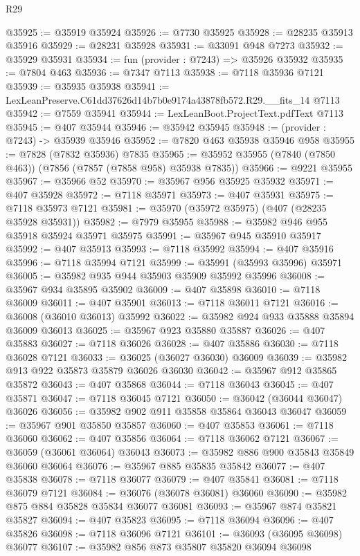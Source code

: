 \begin{lexlean}{R29}
\begin{coremodule}
@35925 := @35919 @35924
@35926 := @7730 @35925
@35928 := @28235 @35913 @35916
@35929 := @28231 @35928
@35931 := @33091 @948 @7273
@35932 := @35929 @35931
@35934 := fun (provider : @7243) => @35926 @35932
@35935 := @7804 @463
@35936 := @7347 @7113
@35938 := @7118 @35936 @7121
@35939 := @35935 @35938
@35941 := LexLeanPreserve.C61dd37626d14b7b0e9174a43878fb572.R29.__fits_14 @7113
@35942 := @7559 @35941
@35944 := LexLeanBoot.ProjectText.pdfText @7113
@35945 := @407 @35944
@35946 := @35942 @35945
@35948 := (provider : @7243) -> @35939 @35946
@35952 := @7820 @463 @35938 @35946 @958
@35955 := @7828 (@7832 @35936) @7835
@35965 := @35952 @35955 (@7840 (@7850 @463)) (@7856 (@7857 (@7858 @958) @35938 @7835))
@35966 := @9221 @35955
@35967 := @35966 @52
@35970 := @35967 @956 @35925 @35932
@35971 := @407 @35928
@35972 := @7118 @35971
@35973 := @407 @35931
@35975 := @7118 @35973 @7121
@35981 := @35970 (@35972 @35975) (@407 (@28235 @35928 @35931))
@35982 := @7979 @35955
@35988 := @35982 @946 @955 @35918 @35924 @35971 @35975
@35991 := @35967 @945 @35910 @35917
@35992 := @407 @35913
@35993 := @7118 @35992
@35994 := @407 @35916
@35996 := @7118 @35994 @7121
@35999 := @35991 (@35993 @35996) @35971
@36005 := @35982 @935 @944 @35903 @35909 @35992 @35996
@36008 := @35967 @934 @35895 @35902
@36009 := @407 @35898
@36010 := @7118 @36009
@36011 := @407 @35901
@36013 := @7118 @36011 @7121
@36016 := @36008 (@36010 @36013) @35992
@36022 := @35982 @924 @933 @35888 @35894 @36009 @36013
@36025 := @35967 @923 @35880 @35887
@36026 := @407 @35883
@36027 := @7118 @36026
@36028 := @407 @35886
@36030 := @7118 @36028 @7121
@36033 := @36025 (@36027 @36030) @36009
@36039 := @35982 @913 @922 @35873 @35879 @36026 @36030
@36042 := @35967 @912 @35865 @35872
@36043 := @407 @35868
@36044 := @7118 @36043
@36045 := @407 @35871
@36047 := @7118 @36045 @7121
@36050 := @36042 (@36044 @36047) @36026
@36056 := @35982 @902 @911 @35858 @35864 @36043 @36047
@36059 := @35967 @901 @35850 @35857
@36060 := @407 @35853
@36061 := @7118 @36060
@36062 := @407 @35856
@36064 := @7118 @36062 @7121
@36067 := @36059 (@36061 @36064) @36043
@36073 := @35982 @886 @900 @35843 @35849 @36060 @36064
@36076 := @35967 @885 @35835 @35842
@36077 := @407 @35838
@36078 := @7118 @36077
@36079 := @407 @35841
@36081 := @7118 @36079 @7121
@36084 := @36076 (@36078 @36081) @36060
@36090 := @35982 @875 @884 @35828 @35834 @36077 @36081
@36093 := @35967 @874 @35821 @35827
@36094 := @407 @35823
@36095 := @7118 @36094
@36096 := @407 @35826
@36098 := @7118 @36096 @7121
@36101 := @36093 (@36095 @36098) @36077
@36107 := @35982 @856 @873 @35807 @35820 @36094 @36098

\end{coremodule}
\end{lexlean}

